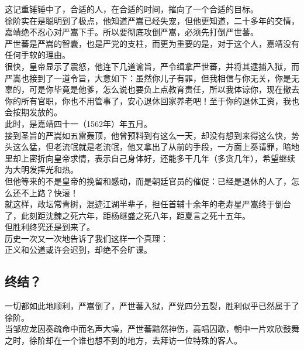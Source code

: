 \begin{multicols}{\theparacolNo}
这记重锤锤中了，合适的人，在合适的时间，摧向了一个合适的目标。\\

徐阶实在是聪明到了极点，他知道严嵩已经失宠，但他更知道，二十多年的交情，嘉靖绝不忍心对严嵩下手。所以要彻底攻倒严嵩，必须先打倒严世蕃。\\

严世蕃是严嵩的智囊，也是严党的支柱，而更为重要的是，对于这个人，嘉靖没有任何手软的理由。\\

很快，皇帝显示了震怒，他连下几道谕旨，严令缉拿严世蕃，并将其逮捕入狱，而严嵩也接到了一道令旨，大意如下：虽然你儿子有罪，但我相信与你无关，你是无辜的，可是你毕竟是他爹，怎么说也要负上点教育责任，所以我体谅你，现在撤去你的所有官职，你也不用管事了，安心退休回家养老吧！至于你的退休工资，我也会按期发放的。\\

此时，是嘉靖四十一（1562年）年五月。\\

接到圣旨的严嵩如五雷轰顶，他曾预料到有这么一天，却没有想到来得这么快，势头这么猛，但老流氓就是老流氓，他又拿出了从前的手段，一方面上奏请罪，暗地里却上密折向皇帝求情，表示自己身体好，还能多干几年（多贪几年），希望继续为大明发挥光和热。\\

但他等来的不是皇帝的挽留和感动，而是朝廷官员的催促：已经是退休的人了，怎么还不上路？快滚！\\

就这样，政坛常青树，混迹江湖半辈子，担任首辅十余年的老寿星严嵩终于倒台了，此刻距沈鍊之死六年，距杨继盛之死八年，距夏言之死十五年。\\

但胜利终究还是到来了。\\

历史一次又一次地告诉了我们这样一个真理：\\

正义和公道或许会迟到，却绝不会旷课。\\

\subsection{终结？}
一切都如此地顺利，严嵩倒了，严世蕃入狱，严党四分五裂，胜利似乎已然属于了徐阶。\\

当邹应龙因奏疏命中而名声大噪，严世蕃黯然神伤，高唱囚歌，朝中一片欢欣鼓舞之时，徐阶却在一个谁也想不到的地方，去拜访一位特殊的客人。\\


\end{multicols}
